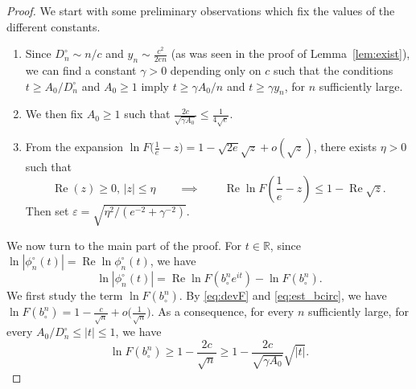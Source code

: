 \documentclass[AHL,XML,longabstracts,Unicode]{cedram}
\renewcommand{\Re}{\operatorname{Re}}
\newcommand{\R}{\mathbb{R}}
\def\bcn{b_{\circ}^{n}}
\def\phicn{\phi^{\circ}_{n}}
\def\Dcn{D^{\circ}_{n}}
\renewcommand{\epsilon}{\varepsilon}
\begin{document}
\begin{proof}We start with some preliminary observations which fix the values of the different constants.
\begin{enumerate}
\item[--]  Since $\Dcn \sim n /c$ and $y_{n} \sim \frac{c^{2}}{2en}$ (as was seen in the proof of Lemma~\ref{lem:exist}),
  we can find a constant $\gamma>0$ depending only on $c$ such that
  the conditions $t \ge  {A_0}/{\Dcn}$ and $A_{0} \geq 1$ imply
  $t \ge {\gamma A_0}/{n}$ and $t \ge \gamma y_{n}$,
  for $n$ sufficiently large.
\item[--] We then fix $A_{0} \geq 1$ such that $\frac{2c}{\sqrt{\gamma A_{0}}} \leq  \frac{1}{4\sqrt{e}}$.
\item[--] From the expansion $ \ln F \big( \tfrac{1}{e}-z \big)= 1-\sqrt{2e} \sqrt{z}+o(\sqrt{z})$, there exists $\eta>0$ such that
\begin{equation}
\label{eq:z} \Re(z) \ge 0, \, |z| \leq \eta  \qquad \implies  \qquad  \Re \ln F \left( \frac{1}{e}-z \right) \leq  1-  \Re \sqrt{z}.
\end{equation}
Then set $\epsilon= \sqrt{\eta^{2}/(e^{-2}+\gamma^{-2})}$.
\end{enumerate}


We now turn to the main part of the proof. For $t \in \R$, since
$ \ln |\phicn(t)| =\Re \ln \phicn(t)$, we have
\begin{equation}
\label{eq:lnphi} \ln |\phicn(t)| =\Re \ln F( \bcn e^{it})- \ln F( \bcn).
\end{equation}
We first study the term $\ln F( \bcn)$.
By \eqref{eq:devF} and \eqref{eq:est_bcirc}, we have $\ln F( \bcn)=1- \tfrac{c}{\sqrt{n}}+ o \big(  \frac{1}{\sqrt{n}} \big)$.  As a consequence, for every $n$ sufficiently large, for every $  {A_{0}}/{\Dcn} \leq |t| \leq 1$, we have
\begin{equation}
\label{eq:ln}\ln F( \bcn) \geq 1- \frac{2c}{\sqrt{n}} \geq 1- \frac{2c}{\sqrt{\gamma A_{0}}} \sqrt{|t|}.
\end{equation}


\end{proof}
\end{document}
